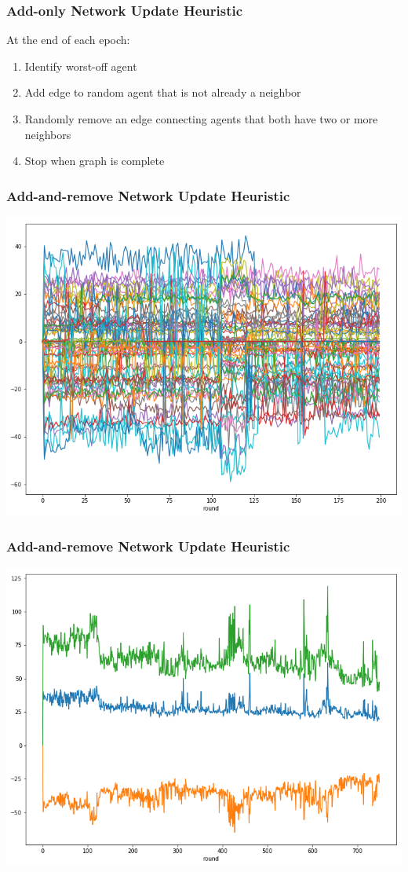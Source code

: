 \documentclass{beamer}
\begin{document}
\begin{frame}
  \frametitle{Add-only Network Update Heuristic}
  At the end of each epoch:
  \begin{enumerate}
  \item Identify worst-off agent
  \item Add edge to random agent that is not already a neighbor
  \item Randomly remove an edge connecting agents that both have two or more neighbors
  \item Stop when graph is complete
  \end{enumerate}
\end{frame}

\begin{frame}
  \frametitle{Add-and-remove Network Update Heuristic}
  \includegraphics[width=\textwidth]{h2startwealth.png}
\end{frame}

\begin{frame}
  \frametitle{Add-and-remove Network Update Heuristic}
  \includegraphics[width=\textwidth]{h2startgap.png}
\end{frame}
\end{document}
